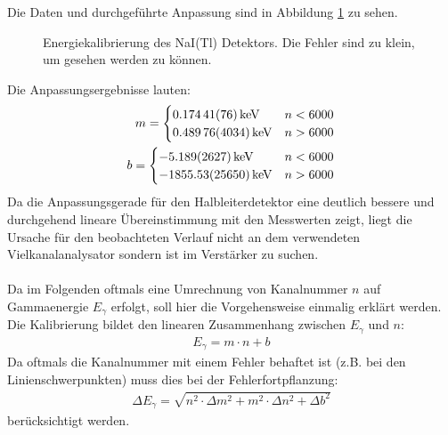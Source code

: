 \documentclass[11pt, a4paper]{article}
\numberwithin{equation}{section}
\begin{document}
Die Daten und durchgeführte Anpassung sind in Abbildung \ref{fig:kalibrierung_szinti} zu sehen.
\begin{figure}[ht]
	\centering
	
	\caption{Energiekalibrierung des NaI(Tl) Detektors. Die Fehler sind zu klein, um gesehen werden zu können.}
	\label{fig:kalibrierung_szinti}
\end{figure}
Die Anpassungsergebnisse lauten:
\begin{align}
	m = 
	\begin{cases}
	\SI{0.17441+-0.00076}{\kilo\electronvolt} & n < 6000 \\
	\SI{0.48976+-0.04034}{\kilo\electronvolt} & n > 6000
	\end{cases}\\
	b = 
	\begin{cases}
	\SI{-5.189+-2.627}{\kilo\electronvolt} & n < 6000 \\
	\SI{-1855.53+-256.50}{\kilo\electronvolt} & n > 6000
	\end{cases}
\end{align}
Da die Anpassungsgerade für den Halbleiterdetektor eine deutlich bessere und durchgehend lineare Übereinstimmung mit den Messwerten zeigt, liegt die Ursache für den beobachteten Verlauf nicht an dem verwendeten Vielkanalanalysator sondern ist im Verstärker zu suchen.\\
\\
Da im Folgenden oftmals eine Umrechnung von Kanalnummer $n$ auf Gammaenergie $E_\gamma$ erfolgt, soll hier die Vorgehensweise einmalig erklärt werden.
Die Kalibrierung bildet den linearen Zusammenhang zwischen $E_\gamma$ und $n$:
\begin{align}
	E_\gamma = m \cdot n + b
\end{align}
Da oftmals die Kanalnummer mit einem Fehler behaftet ist (z.B. bei den Linienschwerpunkten) muss dies bei der Fehlerfortpflanzung:
\begin{align}
	\Delta E_\gamma = \sqrt{n^2 \cdot \Delta m^2 + m^2 \cdot \Delta n^2 + \Delta b^2}
\end{align}
berücksichtigt werden.
\end{document}
